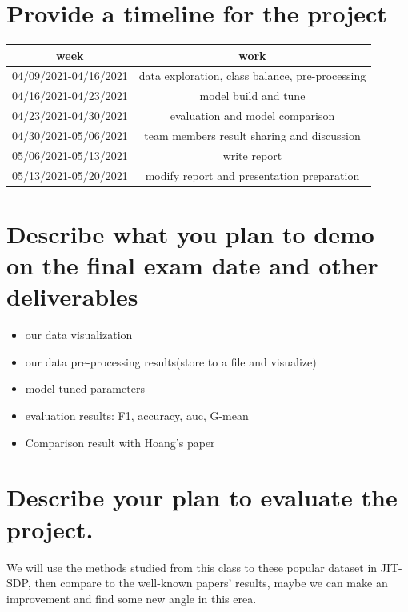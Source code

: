 \documentclass{article}
\begin{document}
\section{Provide a timeline for the project}
\begin{center}
	\begin{tabular}{ c c  }
		week & work \\ 
		\hline
		04/09/2021-04/16/2021 & data exploration, class balance, pre-processing \\ 
		04/16/2021-04/23/2021 & model build and tune \\  
		04/23/2021-04/30/2021 & evaluation and model comparison \\
		04/30/2021-05/06/2021 & team members result sharing and discussion   \\
		05/06/2021-05/13/2021 & write report  \\ 
		05/13/2021-05/20/2021 & modify report and presentation preparation  \\
		\hline
	\end{tabular}
\end{center}

\section{Describe what you plan to demo on the final exam date and other deliverables}
\begin{itemize}
	\item our data visualization 
	\item our data pre-processing results(store to a file and visualize)
	\item model tuned parameters
	\item evaluation results: F1, accuracy, auc, G-mean
	\item Comparison result with Hoang's paper~\cite{hoang2019deepjit}
\end{itemize}

\section{Describe your plan to evaluate the project.}
We will use the methods studied from this class to these popular dataset in JIT-SDP, then compare to the well-known papers' results, maybe we can make an improvement and find some new angle in this erea.















\medskip



\end{document}
